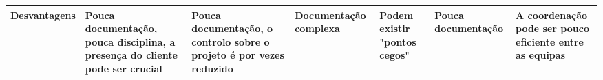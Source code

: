 \begin{table}
{\begin{tabular}{|l|l|l|l|l|l|l|}
Desvantagens                   & Pouca documentação, pouca disciplina, a presença do cliente pode ser crucial                                      & Pouca documentação, o controlo sobre o projeto é por vezes reduzido & Documentação complexa                                     & Podem existir "pontos cegos"                                                  & Pouca documentação                                                                                    & A coordenação pode ser pouco eficiente entre as equipas                   \\ \hline
\end{tabular}}
\end{table}